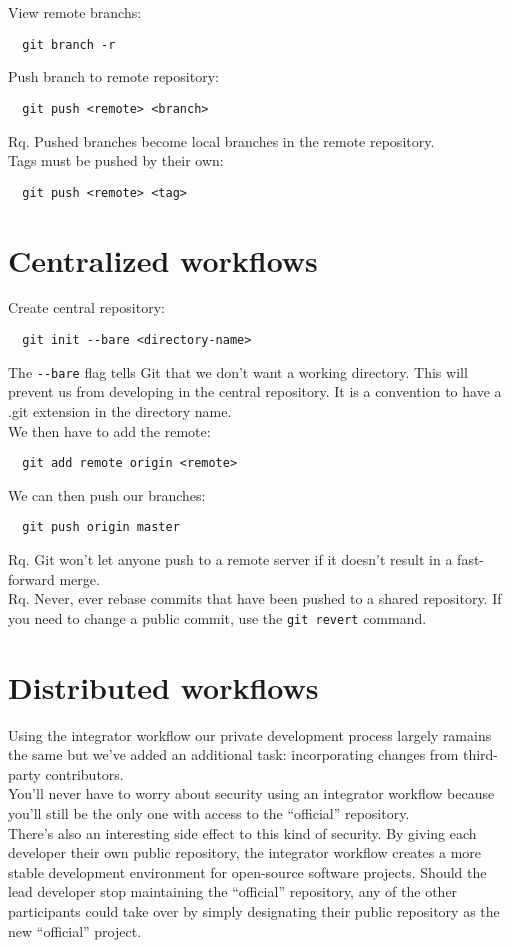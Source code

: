 \documentclass[french]{article}
\begin{document}
View remote branchs:
\begin{verbatim}
  git branch -r
\end{verbatim}

Push branch to remote repository:
\begin{verbatim}
  git push <remote> <branch>
\end{verbatim}
Rq. \danger Pushed branches become local branches in the remote repository.\\

Tags must be pushed by their own:
\begin{verbatim}
  git push <remote> <tag>
\end{verbatim}

\section{Centralized workflows}

Create central repository:
\begin{verbatim}
  git init --bare <directory-name>
\end{verbatim}
The \verb|--bare| flag tells Git that we don't want a working directory. This will prevent us from developing in the central repository. It is a convention to have a .git extension in the directory name. \\

We then have to add the remote:
\begin{verbatim}
  git add remote origin <remote>
\end{verbatim}


We can then push our branches:
\begin{verbatim}
  git push origin master
\end{verbatim}

Rq. Git won't let anyone push to a remote server if it doesn't result in a fast-forward merge.\\

Rq. Never, ever rebase commits that have been pushed to a shared repository. If you need to change a public commit, use the \verb|git revert| command.

\section{Distributed workflows}

Using the integrator workflow our private development process largely ramains the same but we've added an additional task: incorporating changes from third-party contributors.\\
You'll never have to worry about security using an integrator workflow because you'll still be the only one with access to the ``official'' repository.\\
There's also an interesting side effect to this kind of security. By giving each developer their own public repository, the integrator workflow creates a more stable development environment for open-source software projects. Should the lead developer stop maintaining the ``official'' repository, any of the other participants could take over by simply designating their public repository as the new ``official'' project.
\end{document}
